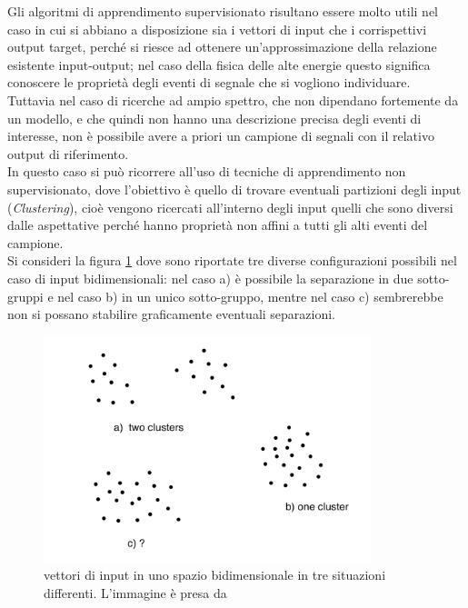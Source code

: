 Gli algoritmi di apprendimento supervisionato risultano essere molto utili nel caso in cui si abbiano a disposizione sia i vettori di input che i corrispettivi output target, perché si riesce ad ottenere un'approssimazione della relazione esistente input-output; nel caso della fisica delle alte energie questo significa conoscere le proprietà degli eventi di segnale che si vogliono individuare.\\
Tuttavia nel caso di ricerche ad ampio spettro, che non dipendano fortemente da un modello, e che quindi non hanno una descrizione precisa degli eventi di interesse, non è possibile avere a priori un campione di segnali con il relativo output di riferimento. \\
In questo caso si può ricorrere all'uso di tecniche di apprendimento non supervisionato, dove l'obiettivo è quello di trovare eventuali partizioni degli input (\textit{Clustering}), cioè vengono ricercati all'interno degli input quelli che sono diversi dalle aspettative perché hanno proprietà non affini a tutti gli alti eventi del campione. \\
Si consideri la figura \ref{Unsup} dove sono riportate tre diverse configurazioni possibili nel caso di input bidimensionali: nel caso a) è possibile la separazione in due sotto-gruppi e nel caso b) in un unico sotto-gruppo, mentre nel caso c) sembrerebbe non si possano stabilire graficamente eventuali separazioni.

\begin{figure}[h!]
	\centering
	\includegraphics[width=0.85\textwidth]{figs/Unsup_learning.png}
	\caption{vettori di input in uno spazio bidimensionale in tre situazioni differenti. L'immagine è presa da \cite{IntroML}}
	\label{Unsup}
\end{figure}


